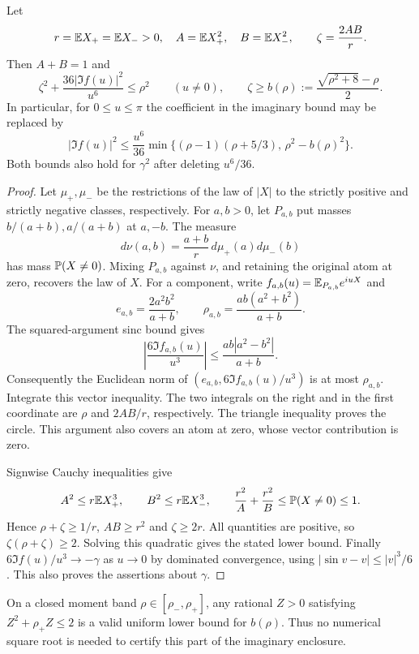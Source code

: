 \begin{lemma}\label{ms:fourier:afcore:lem:sine-circle}
Let
\[
 r=\mathbb E X_+=\mathbb E X_->0,\quad A=\mathbb E X_+^2,\quad B=\mathbb E X_-^2,
 \qquad \zeta=\frac{2AB}{r}.
\]
Then $A+B=1$ and
\begin{equation}\label{ms:fourier:afcore:eq:sine-circle}
 \zeta^2+\frac{36|\Im f(u)|^2}{u^6}\le\rho^2
 \qquad(u\ne0),\qquad
 \zeta\ge b(\rho):=\frac{\sqrt{\rho^2+8}-\rho}{2}.
\end{equation}
In particular, for $0\le u\le\pi$ the coefficient in the imaginary
bound may be replaced by
\[
 |\Im f(u)|^2\le\frac{u^6}{36}
 \min\{(\rho-1)(\rho+5/3),\,\rho^2-b(\rho)^2\}.
\]
Both bounds also hold for $\gamma^2$ after deleting $u^6/36$.
\end{lemma}
\begin{proof}
Let $\mu_+,\mu_-$ be the restrictions of the law of $|X|$ to the
strictly positive and strictly negative classes, respectively. For
$a,b>0$, let $P_{a,b}$ put masses $b/(a+b),a/(a+b)$ at $a,-b$.
The measure
\[
 d\nu(a,b)=\frac{a+b}{r}\,d\mu_+(a)d\mu_-(b)
\]
has mass $\mathbb P(X\ne0)$. Mixing $P_{a,b}$ against $\nu$, and retaining
the original atom at zero, recovers the law of $X$.
For a component, write $f_{a,b}(u)=\mathbb E_{P_{a,b}}e^{iuX}$ and
\[
 e_{a,b}=\frac{2a^2b^2}{a+b},\qquad
 \rho_{a,b}=\frac{ab(a^2+b^2)}{a+b}.
\]
The squared-argument sinc bound gives
\[
 \left|\frac{6\Im f_{a,b}(u)}{u^3}\right|
 \le\frac{ab|a^2-b^2|}{a+b}.
\]
Consequently the Euclidean norm of
$(e_{a,b},6\Im f_{a,b}(u)/u^3)$ is at most $\rho_{a,b}$.
Integrate this vector inequality. The two integrals on the right and
in the first coordinate are $\rho$ and $2AB/r$, respectively.
The triangle inequality proves the circle. This argument also covers
an atom at zero, whose vector contribution is zero.

Signwise Cauchy inequalities give
\[
 A^2\le r\mathbb E X_+^3,\qquad B^2\le r\mathbb E X_-^3,\qquad
 \frac{r^2}{A}+\frac{r^2}{B}\le\mathbb P(X\ne0)\le1.
\]
Hence $\rho+\zeta\ge1/r$, $AB\ge r^2$ and $\zeta\ge2r$.
All quantities are positive, so
$\zeta(\rho+\zeta)\ge2$. Solving this quadratic gives the stated
lower bound. Finally
$6\Im f(u)/u^3\longrightarrow-\gamma$ as $u\to0$ by dominated
convergence, using $|\sin v-v|\le|v|^3/6$. This also proves the assertions
about $\gamma$.
\end{proof}

On a closed moment band $\rho\in[\rho_-,\rho_+]$, any rational $Z>0$
satisfying $Z^2+\rho_+Z\le2$ is a valid uniform lower bound for
$b(\rho)$. Thus no numerical square root is needed to certify this
part of the imaginary enclosure.

